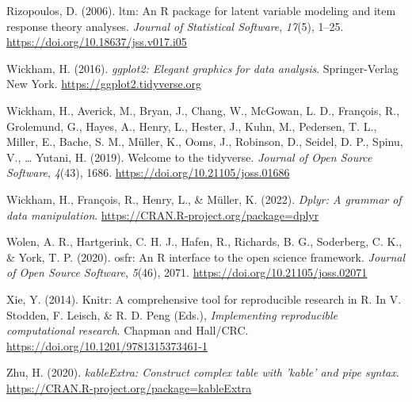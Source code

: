 \documentclass[
  bookmarksnumbered]{article}
\newlength{\cslhangindent}
\newlength{\cslentryspacingunit} %
\newenvironment{CSLReferences}[2] %
 {%
  \setlength{\parindent}{0pt}
  \ifodd #1
  \let\oldpar\par
  \def\par{\hangindent=\cslhangindent\oldpar}
  \fi
  \setlength{\parskip}{#2\cslentryspacingunit}
 }%
 {}
\begin{document}
\begin{CSLReferences}{1}{0}
\leavevmode{}%
Rizopoulos, D. (2006). {ltm}: An {R} package for latent variable modeling and item response theory analyses. \emph{Journal of Statistical Software}, \emph{17}(5), 1--25. \url{https://doi.org/10.18637/jss.v017.i05}

\leavevmode{}%
Wickham, H. (2016). \emph{ggplot2: Elegant graphics for data analysis}. Springer-Verlag New York. \url{https://ggplot2.tidyverse.org}

\leavevmode{}%
Wickham, H., Averick, M., Bryan, J., Chang, W., McGowan, L. D., François, R., Grolemund, G., Hayes, A., Henry, L., Hester, J., Kuhn, M., Pedersen, T. L., Miller, E., Bache, S. M., Müller, K., Ooms, J., Robinson, D., Seidel, D. P., Spinu, V., \ldots{} Yutani, H. (2019). Welcome to the {tidyverse}. \emph{Journal of Open Source Software}, \emph{4}(43), 1686. \url{https://doi.org/10.21105/joss.01686}

\leavevmode{}%
Wickham, H., François, R., Henry, L., \& Müller, K. (2022). \emph{Dplyr: A grammar of data manipulation}. \url{https://CRAN.R-project.org/package=dplyr}

\leavevmode{}%
Wolen, A. R., Hartgerink, C. H. J., Hafen, R., Richards, B. G., Soderberg, C. K., \& York, T. P. (2020). {osfr}: An {R} interface to the open science framework. \emph{Journal of Open Source Software}, \emph{5}(46), 2071. \url{https://doi.org/10.21105/joss.02071}

\leavevmode{}%
Xie, Y. (2014). Knitr: A comprehensive tool for reproducible research in {R}. In V. Stodden, F. Leisch, \& R. D. Peng (Eds.), \emph{Implementing reproducible computational research}. {Chapman and Hall/CRC}. \url{https://doi.org/10.1201/9781315373461-1}

\leavevmode{}%
Zhu, H. (2020). \emph{kableExtra: Construct complex table with 'kable' and pipe syntax}. \url{https://CRAN.R-project.org/package=kableExtra}

\end{CSLReferences}
\end{document}
